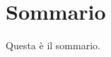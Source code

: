 \documentclass[../main.tex]{subfiles}
\begin{document}
	
	\chapter*{Sommario}
	
	Questa è il sommario.
	
\end{document}
